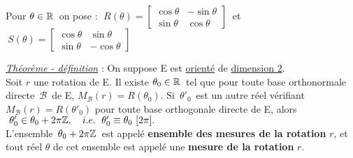 \vspace{2.3cm}

Pour \(\theta\in \mathbb{R}\,\) on pose : \(\;R(\theta)=\left[
\begin{array}{lr}
    \cos \theta & -\sin \theta \\
    \sin \theta & \cos \theta
\end{array}
 \right]\ \) et \(\ S(\theta)=\left[
\begin{array}{lr}
    \cos \theta & \sin \theta \\
    \sin \theta & -\cos \theta 
\end{array}
\right]\)


\vspace{1.8cm}

\underline{\emph{Théorème - définition}} : On suppose E est \underline{orienté} de \underline{dimension 2}.\vspace{0.1cm}\\
Soit $r$ une rotation de E. Il existe \(\theta_0\in \mathbb{R}\,\) tel que pour toute base orthonormale directe \(\,\mathcal{B}\,\) de E, \(M_\mathcal{B}(r)=R(\theta_0)\). Si \(\,\theta'_0\,\) est un autre réel vérifiant \(M_\mathcal{B}(r)=R(\theta'_0)\) pour toute base orthogonale directe de E, alors \(\ \theta'_0 \in \theta_0 +2\pi \mathbb{Z},\quad i.e.\ \; \theta'_0\equiv \theta_0\ [2\pi] . \)\vspace{0.2cm}\\
L'ensemble \(\,\theta_0+2\pi \mathbb{Z}\,\) est appelé \textbf{ensemble des mesures de la rotation} $r$, et tout réel $\theta$ de cet ensemble est appelé une \textbf{mesure de la rotation} $r$.

\newpage

